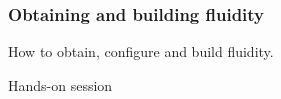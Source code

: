 \documentclass[12pt]{beamer}
\begin{document}
\begin{frame}
    \frametitle{Obtaining and building fluidity}
How to obtain, configure and build fluidity.

Hands-on session
\end{frame}
\end{document}

